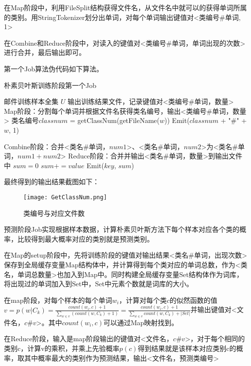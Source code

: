 \documentclass[lang=cn,11pt]{elegantpaper}
\begin{document}
在Map阶段中，利用FileSplit结构获得文件名，从文件名中就可以的获得单词所属的类别。用StringTokenizer划分出单词，对每个单词输出键值对<类编号\#单词, 1>

在Combine和Reduce阶段中，对读入的键值对<类编号\#单词，单词出现的次数>进行合并，最后输出即可。

第一个Job算法伪代码如下算法。

\begin{algorithm}[!htb]
  \caption{朴素贝叶斯训练阶段第一个Job}
  \label{alg:Framwork}
  \begin{algorithmic}[1]
    \Require
    邮件训练样本全集 $U$
    \Ensure
    输出训练结果文件，记录键值对<类编号\#单词，数量>
    \State Map阶段：分割每个单词并根据文件名获得类名编号，输出<类编号\#单词，数量>
        \State 类名编号$classnum$ = getClassNum(getFileName($w$))
        \State Emit($classnum$ + "\#" + $w$, 1)
      \EndFor
   \EndFunction

	\State Combine阶段：合并<类名\#单词，$num1$>、<类名\#单词，$num2$>为<类名\#单词，$num1+num2$>
  \State Reduce阶段：合并并输出<类名\#单词，数量>到输出文件中
    \State $sum = 0$
        \State $sum += value$
    \EndFor
    \State Emit($key$, $sum$)
  \EndFunction
  \end{algorithmic}
\end{algorithm}

最终得到的输出结果截图如下：
\begin{figure}[htbp]
	\centering
	\texttt{[image: GetClassNum.png]}
	\caption{类编号与对应文件数 \label{fig:GetClassNum}}
\end{figure}

预测阶段Job实现根据样本数据，计算朴素贝叶斯方法下每个样本对应各个类的概率，比较得到最大概率对应的类别就是预测类别。

在Map的setup阶段中，先将训练阶段的键值对输出结果<类名\#单词，出现次数>保存到全局缓存变量Map结构体中，并计算得到每个类对应的单词总数，作为<类名，单词总数量>也加入到Map中。同时构建全局缓存变量Set结构体作为词库，将出现过的单词加入到Set中，Set中元素个数就是词库的大小。

在map阶段，对每个样本的每个单词$w_i$，计算对每个类$c$的似然函数的值$v=p(w|C_{k})=\frac{count(w_i, c)+1}{\sum_{w \in v}(count(w, C_{k})+1)}=\frac{count(w_i, c)+1}{\sum_{w \in v}count(w, C_{k})+|Set|}$并输出键值对<文件名，$c\#v$>。其中$count(w_i, c)$可以通过Map映射找到。

在Reduce阶段，输入是map阶段输出的键值对<文件名，$c\#v$>，对于每个相同的类别c，计算v的乘积，并乘上先验概率$p(c)$得到结果就是该样本对应类别c的概率，取其中概率最大的类别作为预测结果，输出<文件名，预测类编号>
\end{document}

